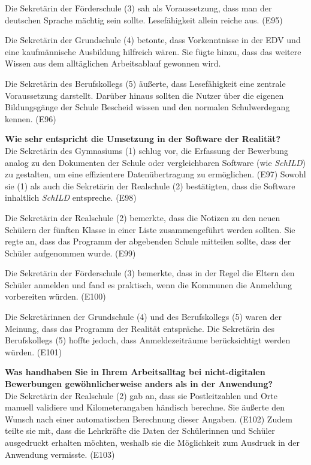Die Sekretärin der Förderschule (3) sah als Voraussetzung, dass man der deutschen Sprache mächtig sein sollte. Lesefähigkeit allein reiche aus. (E95)

Die Sekretärin der Grundschule (4) betonte, dass Vorkenntnisse in der EDV und eine kaufmännische Ausbildung hilfreich wären. Sie fügte hinzu, dass das weitere Wissen aus dem alltäglichen Arbeitsablauf gewonnen wird.

Die Sekretärin des Berufskollegs (5) äußerte, dass Lesefähigkeit eine zentrale Voraussetzung darstellt. Darüber hinaus sollten die Nutzer über die eigenen Bildungsgänge der Schule Bescheid wissen und den normalen Schulwerdegang kennen. (E96)

\textbf{Wie sehr entspricht die Umsetzung in der Software der Realität?}\\
Die Sekretärin des Gymnasiums (1) schlug vor, die Erfassung der Bewerbung analog zu den Dokumenten der Schule oder vergleichbaren Software (wie \textit{SchILD}) zu gestalten, um eine effizientere Datenübertragung zu ermöglichen. (E97) Sowohl sie (1) als auch die Sekretärin der Realschule (2) bestätigten, dass die Software inhaltlich \textit{SchILD} entspreche. (E98)

Die Sekretärin der Realschule (2) bemerkte, dass die Notizen zu den neuen Schülern der fünften Klasse in einer Liste zusammengeführt werden sollten. Sie regte an, dass das Programm der abgebenden Schule mitteilen sollte, dass der Schüler aufgenommen wurde. (E99)

Die Sekretärin der Förderschule (3) bemerkte, dass in der Regel die Eltern den Schüler anmelden und fand es praktisch, wenn die Kommunen die Anmeldung vorbereiten würden. (E100)

Die Sekretärinnen der Grundschule (4) und des Berufskollegs (5) waren der Meinung, dass das Programm der Realität entspräche. Die Sekretärin des Berufskollegs (5) hoffte jedoch, dass Anmeldezeiträume berücksichtigt werden würden. (E101)

\textbf{Was handhaben Sie in Ihrem Arbeitsalltag bei nicht-digitalen Bewerbungen gewöhnlicherweise anders als in der Anwendung?}\\
Die Sekretärin der Realschule (2) gab an, dass sie Postleitzahlen und Orte manuell validiere und Kilometerangaben händisch berechne. Sie äußerte den Wunsch nach einer automatischen Berechnung dieser Angaben. (E102) Zudem teilte sie mit, dass die Lehrkräfte die Daten der Schülerinnen und Schüler ausgedruckt erhalten möchten, weshalb sie die Möglichkeit zum Ausdruck in der Anwendung vermisste. (E103)

